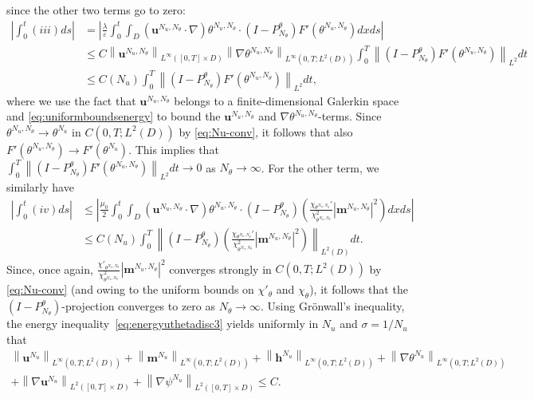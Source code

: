 \documentclass[10pt,letterpaper,twoside]{amsart}
\theoremstyle{definition}{\newtheorem{definition}[lemma]{Definition}}
\theoremstyle{note}{\newtheorem{claim}{Claim}[section]
\newtheorem*{claim*}{Claim}}
\numberwithin{equation}{section}
\newcommand{\dom}{D}
\newcommand{\norm}[1]{\left\| #1 \right\|}
\newcommand{\Grad}{\nabla}
\newcommand{\bmb}{\mathbf{m}^{N_u,N_\theta}}
\newcommand{\bub}{\mathbf{u}^{N_u,N_\theta}}
\newcommand{\thb}{\theta^{N_u,N_\theta}}
\newcommand{\bmc}{\mathbf{m}^{N_u}}
\newcommand{\bhc}{\mathbf{h}^{N_u}}
\newcommand{\buc}{\mathbf{u}^{N_u}}
\newcommand{\thc}{\theta^{N_u}}
\newcommand{\psic}{\psi^{N_u}}
\begin{document}
 since the other two terms go to zero:  
 \begin{equation*}
 	\begin{split}
 			\left|\int_0^t(iii)ds\right| & = \left|\frac{\lambda}{\varepsilon}\int_0^t\int_{\dom} (\bub\cdot\Grad)\thb\cdot (I-P_{N_\theta}^\theta) F'(\thb) dxds \right|\\
 			& \leq C \norm{\bub}_{L^\infty([0,T]\times\dom)}\norm{\Grad\thb}_{L^\infty(0,T;L^2(\dom))}\int_0^T \norm{(I-P_{N_\theta}^\theta)F'(\thb)}_{L^2}dt \\
 		&\leq C(N_u) \int_0^T \norm{(I-P_{N_\theta}^\theta)F'(\thb)}_{L^2}dt, 
 	\end{split}
  \end{equation*}
  where we use the fact that $\bub$ belongs to a finite-dimensional Galerkin space and \eqref{eq:uniformboundsenergy} to bound the $\bub$ and $\nabla \thb$-terms. Since $\thb \to \theta^{N_u}$ in $C(0,T;L^2(\dom))$ by \eqref{eq:Nu-conv}, it follows that also $F'(\thb) \to F'(\theta^{N_u})$. This implies that $\int_0^T \norm{(I-P_{N_\theta}^\theta)F'(\thb)}_{L^2}dt \to 0$ as $N_\theta \to \infty$.
  For the other term, we similarly have
 \begin{equation*}
 	\begin{split}
 		\left|\int_0^t (iv)ds \right|& \leq \left|\frac{\mu_0}{2}\int_0^t\int_{\dom} (\bub\cdot\Grad)\thb \cdot (I-P_{N_\theta}^\theta) \left(\frac{\chi_{\thb}'}{\chi_{\thb}^2}|\bmb|^2 \right)dx ds\right| \\
        & \leq C(N_u) \int_0^T \norm{(I-P_{N_\theta}^\theta)\left(\frac{\chi_{\thb}'}{\chi_{\thb}^2}|\bmb|^2\right)}_{L^{2}(\dom)} dt.
	\end{split}
 \end{equation*}
 Since, once again, $\frac{\chi'_{\thb}}{\chi^2_{\thb}} |\bmb|^2$ converges strongly in $C(0,T;L^2(\dom))$ by \eqref{eq:Nu-conv} (and owing to the uniform bounds on $\chi'_\theta$ and $\chi_\theta$), it follows that the $(I-P_{N_\theta}^\theta)$-projection converges to zero as $N_\theta\to \infty$.
 Using Gr\"onwall's inequality, the energy inequality~\eqref{eq:energyuthetadisc3} yields uniformly in $N_u$ and $\sigma=1/N_u$ that
 \begin{equation}
 	\label{eq:alluniformbounds}
 	\begin{split}
 	\norm{\buc}_{L^\infty(0,T;L^2(\dom))}+
 	\norm{\bmc}_{L^\infty(0,T;L^2(\dom))}+\norm{\bhc}_{L^\infty(0,T;L^2(\dom))} + \norm{\Grad\thc}_{L^\infty(0,T;L^2(\dom))} \\
 	+ \norm{\Grad\buc}_{L^2([0,T]\times\dom)} + \norm{\Grad\psic}_{L^2([0,T]\times\dom)}\leq C.
 	\end{split}
 \end{equation}
\end{document}
